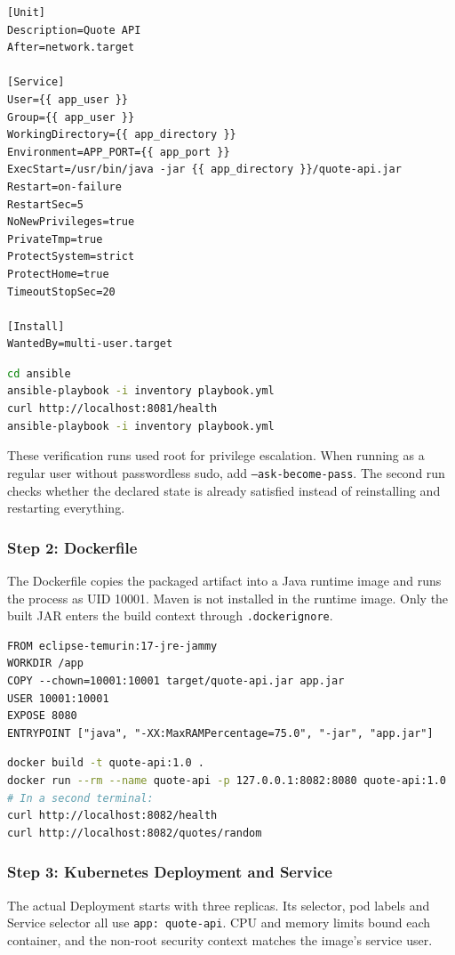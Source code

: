 \documentclass[12pt,a4paper]{article}
\begin{document}
\begin{lstlisting}[language={}]
[Unit]
Description=Quote API
After=network.target

[Service]
User={{ app_user }}
Group={{ app_user }}
WorkingDirectory={{ app_directory }}
Environment=APP_PORT={{ app_port }}
ExecStart=/usr/bin/java -jar {{ app_directory }}/quote-api.jar
Restart=on-failure
RestartSec=5
NoNewPrivileges=true
PrivateTmp=true
ProtectSystem=strict
ProtectHome=true
TimeoutStopSec=20

[Install]
WantedBy=multi-user.target
\end{lstlisting}

\begin{lstlisting}[language={bash}]
cd ansible
ansible-playbook -i inventory playbook.yml
curl http://localhost:8081/health
ansible-playbook -i inventory playbook.yml
\end{lstlisting}


These verification runs used root for privilege escalation. When running as a regular user without passwordless sudo, add \texttt{--ask-become-pass}. The second run checks whether the declared state is already satisfied instead of reinstalling and restarting everything.

\subsubsection*{Step 2: Dockerfile}
The Dockerfile copies the packaged artifact into a Java runtime image and runs the process as UID 10001. Maven is not installed in the runtime image. Only the built JAR enters the build context through \texttt{.dockerignore}.

\begin{lstlisting}[language={}]
FROM eclipse-temurin:17-jre-jammy
WORKDIR /app
COPY --chown=10001:10001 target/quote-api.jar app.jar
USER 10001:10001
EXPOSE 8080
ENTRYPOINT ["java", "-XX:MaxRAMPercentage=75.0", "-jar", "app.jar"]
\end{lstlisting}

\begin{lstlisting}[language={bash}]
docker build -t quote-api:1.0 .
docker run --rm --name quote-api -p 127.0.0.1:8082:8080 quote-api:1.0
# In a second terminal:
curl http://localhost:8082/health
curl http://localhost:8082/quotes/random
\end{lstlisting}


\subsubsection*{Step 3: Kubernetes Deployment and Service}
The actual Deployment starts with three replicas. Its selector, pod labels and Service selector all use \texttt{app: quote-api}. CPU and memory limits bound each container, and the non-root security context matches the image's service user.
\end{document}
